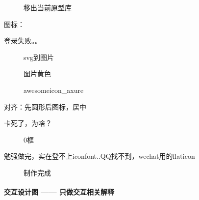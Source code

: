 \documentclass[letterpaper,10pt,english]{sphinxmanual}
\begin{document}
\begin{figure}[H]
\centering
\capstart

\noindent{}
\caption{移出当前原型库}\label{\detokenize{chapter_knowledge/static_page:id10}}\end{figure}

图标：

登录失败。。

\begin{figure}[H]
\centering
\capstart

\noindent{}
\caption{svg到图片}\label{\detokenize{chapter_knowledge/static_page:id11}}\end{figure}

\begin{figure}[H]
\centering
\capstart

\noindent{}
\caption{图片黄色}\label{\detokenize{chapter_knowledge/static_page:id12}}\end{figure}

\begin{figure}[H]
\centering
\capstart

\noindent{}
\caption{awesomeicon\_axure}\label{\detokenize{chapter_knowledge/static_page:id13}}\end{figure}


对齐：先圆形后图标，居中

卡死了，为啥？

\begin{figure}[H]
\centering
\capstart

\noindent{}
\caption{0框}\label{\detokenize{chapter_knowledge/static_page:id14}}\end{figure}

勉强做完，实在登不上iconfont..QQ找不到，wechat用的flaticon

\begin{figure}[H]
\centering
\capstart

\noindent{}
\caption{制作完成}\label{\detokenize{chapter_knowledge/static_page:id15}}\end{figure}


\paragraph{交互设计图 —— 只做交互相关解释}
\label{\detokenize{chapter_knowledge/static_page:ui-design-docs}}\label{\detokenize{chapter_knowledge/static_page:id3}}
\end{document}
